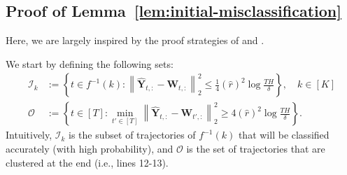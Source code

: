 \documentclass[twoside]{article}
\def\mW{{\bm{W}}}
\def\mY{{\bm{Y}}}
\def\gI{{\mathcal{I}}}
\def\gO{{\mathcal{O}}}
\theoremstyle{plain}
\def\bignorm#1{\left\lVert #1 \right\rVert}
\begin{document}
\subsection{Proof of Lemma~\ref{lem:initial-misclassification}}
Here, we are largely inspired by the proof strategies of \citet[Appendix C]{yun2014adaptive} and \citet[Appendix C.2]{yun2016labeled}.
    
We start by defining the following sets:
\begin{align}
    \gI_k &:= \left\{ t \in f^{-1}(k) : \bignorm{\widehat{\mY}_{t,:} - \mW_{t,:}}_2^2 \leq \frac{1}{4} (\widehat{r})^2 \log\frac{TH}{\delta} \right\}, \quad k \in [K] \\
    \gO &:= \left\{ t \in [T] : \min_{t' \in [T]} \bignorm{\widehat{\mY}_{t,:} - \mW_{t',:}}_2^2 \geq 4 (\widehat{r})^2 \log\frac{TH}{\delta} \right\}.
\end{align}
Intuitively, $\gI_k$ is the subset of trajectories of $f^{-1}(k)$ that will be classified accurately (with high probability), and $\gO$ is the set of trajectories that are clustered at the end (i.e., lines 12-13).
\end{document}
